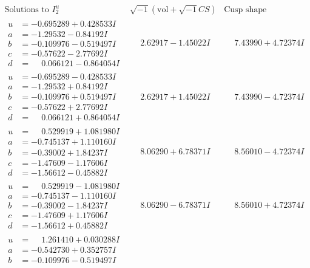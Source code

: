 \documentclass[1p]{elsarticle_modified}
\theoremstyle{definition}
\newcommand{\I}{\sqrt{-1}}
\begin{document}
$$\begin{array}{c|c|c}  
\text{Solutions to }I^u_{2}& \I (\text{vol} + \sqrt{-1}CS) & \text{Cusp shape}\\
 \hline 
\begin{aligned}
u &= -0.695289 + 0.428533 I \\
a &= -1.29532 - 0.84192 I \\
b &= -0.109976 - 0.519497 I \\
c &= -0.57622 - 2.77692 I \\
d &= \phantom{-}0.066121 - 0.864054 I\end{aligned}
 & \phantom{-}2.62917 - 1.45022 I & \phantom{-}7.43990 + 4.72374 I \\ \hline\begin{aligned}
u &= -0.695289 - 0.428533 I \\
a &= -1.29532 + 0.84192 I \\
b &= -0.109976 + 0.519497 I \\
c &= -0.57622 + 2.77692 I \\
d &= \phantom{-}0.066121 + 0.864054 I\end{aligned}
 & \phantom{-}2.62917 + 1.45022 I & \phantom{-}7.43990 - 4.72374 I \\ \hline\begin{aligned}
u &= \phantom{-}0.529919 + 1.081980 I \\
a &= -0.745137 + 1.110160 I \\
b &= -0.39002 + 1.84237 I \\
c &= -1.47609 - 1.17606 I \\
d &= -1.56612 - 0.45882 I\end{aligned}
 & \phantom{-}8.06290 + 6.78371 I & \phantom{-}8.56010 - 4.72374 I \\ \hline\begin{aligned}
u &= \phantom{-}0.529919 - 1.081980 I \\
a &= -0.745137 - 1.110160 I \\
b &= -0.39002 - 1.84237 I \\
c &= -1.47609 + 1.17606 I \\
d &= -1.56612 + 0.45882 I\end{aligned}
 & \phantom{-}8.06290 - 6.78371 I & \phantom{-}8.56010 + 4.72374 I \\ \hline\begin{aligned}
u &= \phantom{-}1.261410 + 0.030288 I \\
a &= -0.542730 + 0.352757 I \\
b &= -0.109976 - 0.519497 I \\

\end{aligned}
\end{array}$$
\end{document}
